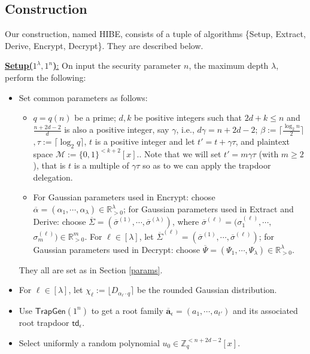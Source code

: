 \documentclass[runningheads]{llncs}
\begin{document}
\subsection{Construction}  
Our construction, named \textsf{HIBE}, consists of a tuple of algorithms \{\textsf{Setup}, \textsf{Extract}, \textsf{Derive}, \textsf{Encrypt}, \textsf{Decrypt}\}. They are described below.
\begin{description}
\item \underline{\textbf{\textsf{Setup}($1^\lambda,1^n$)}:} On input the security parameter $n$, the maximum depth $\lambda$, perform the following:
\begin{itemize}
\item Set common parameters as follows:  \begin{itemize}
\item $q=q(n)$ be a prime; $ d, k $ be positive integers such that $2d+k \leq n$ and $\frac{n+2d-2}{d}$ is also a positive integer, say $\gamma$, i.e., $d \gamma =n+2d-2$; $\beta:=\lceil \frac{\log_2 n}{2} \rceil$ $, \tau:=\lceil \log_2 q \rceil$, $t$ is a positive integer and let $t'=t+\gamma \tau$, and plaintext space $\mathcal{M}:=\{0,1\}^{<k+2}[x]$..   Note that we will set $t'=m\gamma \tau$ (with $m \geq 2$), that is $t$ is a multiple of $\gamma \tau$ so as to we can apply the trapdoor delegation.
\item For Gaussian parameters used in \textsf{Encrypt}: choose $\overline{\alpha}=(\alpha_1,\cdots , \alpha_\lambda) \in \mathbb{R}^{\lambda}_{>0}$; for Gaussian parameters used in \textsf{Extract} and  \textsf{Derive}: choose $\overline{\Sigma}=(\overline{\sigma}^{(1)},\cdots , \overline{\sigma}^{(\lambda)})$, where $\overline{\sigma}^{(\ell)}=(\sigma^{(\ell)}_1, \cdots,$ $ \sigma^{(\ell)}_m) \in \mathbb{R}^{m}_{>0}$. For $\ell \in [\lambda]$, let $\overline{\Sigma}^{(\ell)}=(\overline{\sigma}^{(1)},\cdots , \overline{\sigma}^{(\ell)})$; for Gaussian parameters used in \textsf{Decrypt}: choose $\overline{\Psi}=(\Psi_1, \cdots, \Psi_{\lambda})\in \mathbb{R}^{\lambda}_{>0}$.
\end{itemize} 
They all are set as in Section \ref{params}.
\item For $\ell \in [\lambda]$, let  $\chi_\ell:=\lfloor D_{\alpha_\ell \cdot q}\rceil$ be  the rounded Gaussian distribution.
\item Use $\mathsf{TrapGen}(1^{n})$  to get a root family  $\overline{\mathbf{a}}_{\epsilon}=(a_1,\cdots,a_{t'})$ and its associated root trapdoor $\mathsf{td}_\epsilon$. 
\item Select uniformly a random polynomial $u_0 \in \mathbb{Z}_q^{<n+2d-2}[x]$. 


\end{itemize}
\end{description}
\end{document}
